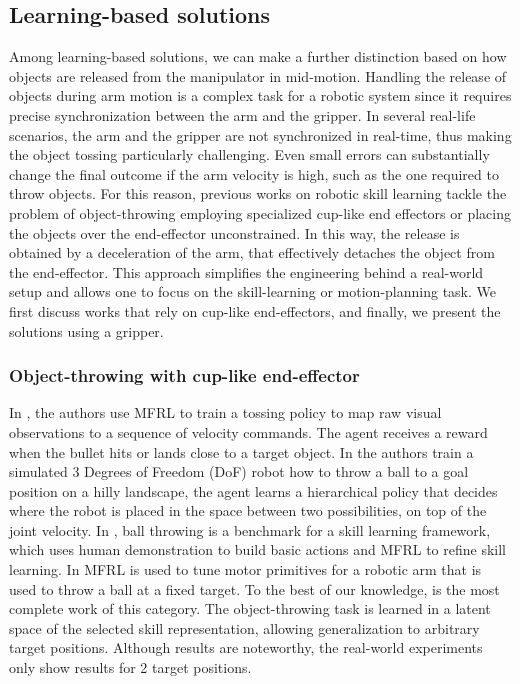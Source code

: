 \subsection{Learning-based solutions}
Among learning-based solutions, we can make a further distinction based on how objects are released from the manipulator in mid-motion.
Handling the release of objects during arm motion is a complex task for a robotic system since it requires precise synchronization between the arm and the gripper. In several real-life scenarios, the arm and the gripper are not synchronized in real-time, thus making the object tossing particularly challenging. Even small errors can substantially change the final outcome if the arm velocity is high, such as the one required to throw objects. 
For this reason, previous works on robotic skill learning tackle the problem of object-throwing employing specialized cup-like end effectors or placing the objects over the end-effector unconstrained. In this way, the release is obtained by a deceleration of the arm, that effectively detaches the object from the end-effector. This approach simplifies the engineering behind a real-world setup and allows one to focus on the skill-learning or motion-planning task. We first discuss works that rely on cup-like end-effectors, and finally, we present the solutions using a gripper.

\subsubsection{Object-throwing with cup-like end-effector}

In \cite{RL_policy_training_ball_throwing}, the authors use MFRL to train a tossing policy to map raw visual observations to a sequence of velocity commands. The agent receives a reward when the bullet hits or lands close to a target object.
In \cite{hierarchical_RL_ball_throwing} the authors train a simulated 3 Degrees of Freedom (DoF) robot how to throw a ball to a goal position on a hilly landscape, the agent learns a hierarchical policy that decides where the robot is placed in the space between two possibilities, on top of the joint velocity.
In \cite{gutzeit2018besman_ball_throwing}, ball throwing is a benchmark for a skill learning framework, which uses human demonstration to build basic actions and MFRL to refine skill learning.
In \cite{kober2012reinforcement_learning_primitives} MFRL is used to tune motor primitives for a robotic arm that is used to throw a ball at a fixed target.
To the best of our knowledge, \cite{robot_skill_learning_deep_autoencoder_ball_throwing} is the most complete work of this category. The object-throwing task is learned in a latent space of the selected skill representation, allowing generalization to arbitrary target positions. Although results are noteworthy, the real-world experiments only show results for 2 target positions.

